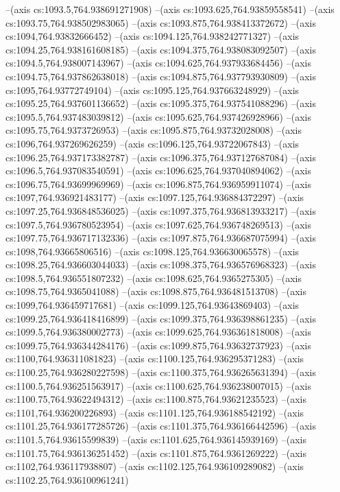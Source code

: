 --(axis cs:1093.5,764.938691271908)
--(axis cs:1093.625,764.93859558541)
--(axis cs:1093.75,764.938502983065)
--(axis cs:1093.875,764.938413372672)
--(axis cs:1094,764.93832666452)
--(axis cs:1094.125,764.938242771327)
--(axis cs:1094.25,764.938161608185)
--(axis cs:1094.375,764.938083092507)
--(axis cs:1094.5,764.938007143967)
--(axis cs:1094.625,764.937933684456)
--(axis cs:1094.75,764.937862638018)
--(axis cs:1094.875,764.937793930809)
--(axis cs:1095,764.93772749104)
--(axis cs:1095.125,764.937663248929)
--(axis cs:1095.25,764.937601136652)
--(axis cs:1095.375,764.937541088296)
--(axis cs:1095.5,764.937483039812)
--(axis cs:1095.625,764.937426928966)
--(axis cs:1095.75,764.9373726953)
--(axis cs:1095.875,764.93732028008)
--(axis cs:1096,764.937269626259)
--(axis cs:1096.125,764.93722067843)
--(axis cs:1096.25,764.937173382787)
--(axis cs:1096.375,764.937127687084)
--(axis cs:1096.5,764.937083540591)
--(axis cs:1096.625,764.937040894062)
--(axis cs:1096.75,764.93699969969)
--(axis cs:1096.875,764.936959911074)
--(axis cs:1097,764.936921483177)
--(axis cs:1097.125,764.936884372297)
--(axis cs:1097.25,764.936848536025)
--(axis cs:1097.375,764.936813933217)
--(axis cs:1097.5,764.936780523954)
--(axis cs:1097.625,764.936748269513)
--(axis cs:1097.75,764.936717132336)
--(axis cs:1097.875,764.936687075994)
--(axis cs:1098,764.93665806516)
--(axis cs:1098.125,764.936630065578)
--(axis cs:1098.25,764.936603044033)
--(axis cs:1098.375,764.936576968323)
--(axis cs:1098.5,764.936551807232)
--(axis cs:1098.625,764.9365275305)
--(axis cs:1098.75,764.9365041088)
--(axis cs:1098.875,764.936481513708)
--(axis cs:1099,764.936459717681)
--(axis cs:1099.125,764.93643869403)
--(axis cs:1099.25,764.936418416899)
--(axis cs:1099.375,764.936398861235)
--(axis cs:1099.5,764.936380002773)
--(axis cs:1099.625,764.936361818008)
--(axis cs:1099.75,764.936344284176)
--(axis cs:1099.875,764.93632737923)
--(axis cs:1100,764.936311081823)
--(axis cs:1100.125,764.936295371283)
--(axis cs:1100.25,764.936280227598)
--(axis cs:1100.375,764.936265631394)
--(axis cs:1100.5,764.936251563917)
--(axis cs:1100.625,764.936238007015)
--(axis cs:1100.75,764.93622494312)
--(axis cs:1100.875,764.93621235523)
--(axis cs:1101,764.936200226893)
--(axis cs:1101.125,764.936188542192)
--(axis cs:1101.25,764.936177285726)
--(axis cs:1101.375,764.936166442596)
--(axis cs:1101.5,764.93615599839)
--(axis cs:1101.625,764.936145939169)
--(axis cs:1101.75,764.936136251452)
--(axis cs:1101.875,764.9361269222)
--(axis cs:1102,764.936117938807)
--(axis cs:1102.125,764.936109289082)
--(axis cs:1102.25,764.936100961241)
